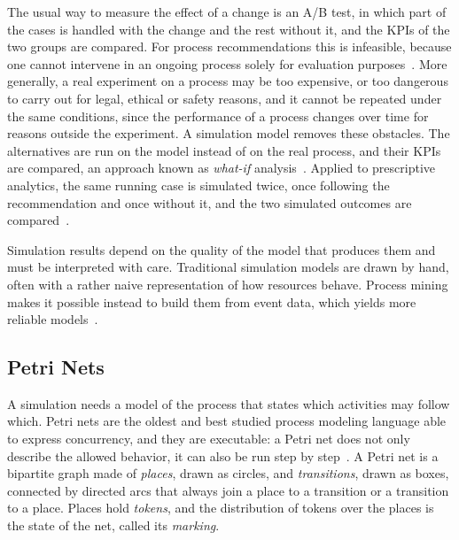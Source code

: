     The usual way to measure the effect of a change is an A/B test, in which part
    of the cases is handled with the change and the rest without it, and the KPIs
    of the two groups are compared. For process recommendations this is
    infeasible, because one cannot intervene in an ongoing process solely for
    evaluation purposes~\cite{le2025balancing}. More generally, a real experiment
    on a process may be too expensive, or too dangerous to carry out for legal,
    ethical or safety reasons, and it cannot be repeated under the same
    conditions, since the performance of a process changes over time for reasons
    outside the
    experiment. A simulation model removes these
    obstacles. The alternatives are run on the model instead of on the real
    process, and their KPIs are compared, an approach known as \emph{what-if}
    analysis~\cite{vanderaalst2015simulation,vinci2025prosit}. Applied to
    prescriptive analytics, the same running case is simulated twice, once
    following the recommendation and once without it, and the two simulated
    outcomes are compared~\cite{le2025balancing}.
    
    Simulation results depend on the quality of the model that produces them
    and must be interpreted with care. Traditional simulation models are drawn
    by hand, often with a rather naive representation of how resources behave.
    Process mining makes it possible instead to build them from event data, which
    yields more reliable models~\cite{vanderaalst2015simulation}.
    
\subsection{Petri Nets}
    \label{subsec:bg:simulation:petri}
    A simulation needs a model of the process that states which activities may
    follow which. Petri nets are the oldest and best studied process modeling
    language able to express concurrency, and they are executable: a Petri net
    does not only describe the allowed behavior, it can also be run step by
    step~\cite{vanderaalst2016}. A Petri net is a bipartite graph made of
    \emph{places}, drawn as circles, and \emph{transitions}, drawn as boxes,
    connected by directed arcs that always join a place to a transition or a
    transition to a place. Places hold \emph{tokens}, and the distribution of
    tokens over the places is the state of the net, called its
    \emph{marking}.
    
